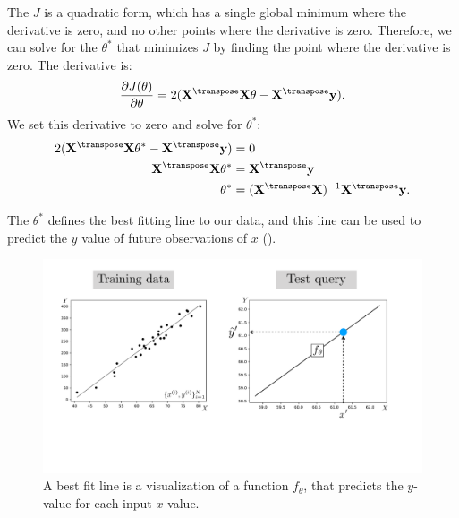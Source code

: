     The $J$ is a quadratic form, which has a single global minimum where the derivative is zero, and no other points where the derivative is zero. Therefore, we can solve for the $\theta^*$ that minimizes $J$ by finding the point where the derivative is zero. The derivative is:
    \begin{align}
        \frac{\partial J(\theta)}{\partial \theta} =  2(\mathbf{X}^\transpose \mathbf{X} \theta - \mathbf{X}^\transpose \mathbf{y}).
    \end{align}
    We set this derivative to zero and solve for $\theta^*$:
    \begin{align}
        2(\mathbf{X}^\transpose \mathbf{X} \theta^* - \mathbf{X}^\transpose \mathbf{y}) & = 0                                                                      \\
        \mathbf{X}^\transpose \mathbf{X} \theta^*                                       & = \mathbf{X}^\transpose \mathbf{y}                                       \\
        \theta^*                                                                        & = (\mathbf{X}^\transpose\mathbf{X})^{-1}\mathbf{X}^\transpose\mathbf{y}.
    \end{align}

    The $\theta^*$ defines the best fitting line to our data, and this line can be used to predict the $y$ value of future observations of $x$ (\fig{\ref{fig:intro_to_learning:ols_fit}}).

    \begin{figure}[h]
        \centerline{
            \includegraphics[width=1\linewidth]{./figures/intro_to_learning/ols_fit.pdf}
        }
        \caption{A best fit line is a visualization of a function $f_{\theta}$, that predicts the $y$-value for each input $x$-value.}
        \label{fig:intro_to_learning:ols_fit}
    \end{figure}

